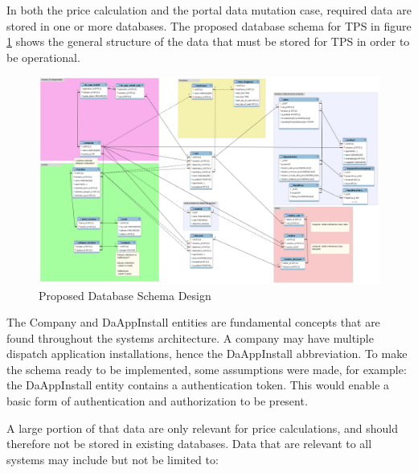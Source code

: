 In both the price calculation and the portal data mutation case, required data are stored in one or more databases. The proposed database schema for TPS in figure \ref{fig:Schema} shows the general structure of the data that must be stored for TPS in order to be operational.

\begin{figure}[ht!]
	\centering
	\includegraphics[width=1\textwidth]{Schema}
	\caption[Database Schema]{Proposed Database Schema Design}
	\label{fig:Schema}
\end{figure}

The Company and DaAppInstall entities are fundamental concepts that are found throughout the systems architecture. A company may have multiple dispatch application installations, hence the DaAppInstall abbreviation. To make the schema ready to be implemented, some assumptions were made, for example: the DaAppInstall entity contains a authentication token. This would enable a basic form of authentication and authorization to be present.

A large portion of that data are only relevant for price calculations, and should therefore not be stored in existing databases. Data that are relevant to all systems may include but not be limited to:

